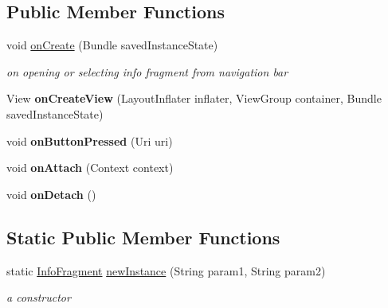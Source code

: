 \subsection*{Public Member Functions}
\begin{DoxyCompactItemize}
\item 
void \hyperlink{classcom_1_1example_1_1sel_1_1lostfound_1_1InfoFragment_a1a9382b4b0ceacfc464559a897fa7656}{on\-Create} (Bundle saved\-Instance\-State)
\begin{DoxyCompactList}\small\item\em on opening or selecting info fragment from navigation bar \end{DoxyCompactList}\item 
\hypertarget{classcom_1_1example_1_1sel_1_1lostfound_1_1InfoFragment_adb5e6a68883e5b4cb236e0e2e221d7f4}{View {\bfseries on\-Create\-View} (Layout\-Inflater inflater, View\-Group container, Bundle saved\-Instance\-State)}\label{classcom_1_1example_1_1sel_1_1lostfound_1_1InfoFragment_adb5e6a68883e5b4cb236e0e2e221d7f4}

\item 
\hypertarget{classcom_1_1example_1_1sel_1_1lostfound_1_1InfoFragment_a20ae678d3072262f318a083241372871}{void {\bfseries on\-Button\-Pressed} (Uri uri)}\label{classcom_1_1example_1_1sel_1_1lostfound_1_1InfoFragment_a20ae678d3072262f318a083241372871}

\item 
\hypertarget{classcom_1_1example_1_1sel_1_1lostfound_1_1InfoFragment_a07cb9a9ac26dec9f20abce73c04f92e1}{void {\bfseries on\-Attach} (Context context)}\label{classcom_1_1example_1_1sel_1_1lostfound_1_1InfoFragment_a07cb9a9ac26dec9f20abce73c04f92e1}

\item 
\hypertarget{classcom_1_1example_1_1sel_1_1lostfound_1_1InfoFragment_a1fff5a01de59e68f81999e2c558325ba}{void {\bfseries on\-Detach} ()}\label{classcom_1_1example_1_1sel_1_1lostfound_1_1InfoFragment_a1fff5a01de59e68f81999e2c558325ba}

\end{DoxyCompactItemize}
\subsection*{Static Public Member Functions}
\begin{DoxyCompactItemize}
\item 
static \hyperlink{classcom_1_1example_1_1sel_1_1lostfound_1_1InfoFragment}{Info\-Fragment} \hyperlink{classcom_1_1example_1_1sel_1_1lostfound_1_1InfoFragment_adb1e26f4f2a3a0f918bff5c5df58e695}{new\-Instance} (String param1, String param2)
\begin{DoxyCompactList}\small\item\em a constructor \end{DoxyCompactList}\end{DoxyCompactItemize}


